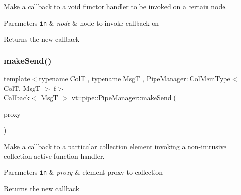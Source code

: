 Make a callback to a void functor handler to be invoked on a certain node. 


\begin{DoxyParams}[1]{Parameters}
\mbox{\tt in}  & {\em node} & node to invoke callback on\\
\hline
\end{DoxyParams}
\begin{DoxyReturn}{Returns}
the new callback 
\end{DoxyReturn}
\mbox{\label{structvt_1_1pipe_1_1_pipe_manager_a612b59953b949edc575577e313e3b187}} 
\subsubsection{\texorpdfstring{make\+Send()}{makeSend()}\hspace{0.1cm}{\footnotesize\ttfamily [4/6]}}
{\footnotesize\ttfamily template$<$typename ColT , typename MsgT , Pipe\+Manager\+::\+Col\+Mem\+Type$<$ Col\+T, Msg\+T $>$ f$>$ \\
\hyperlink{namespacevt_a36db99df4c973d48b1118a293fff533f}{Callback}$<$ MsgT $>$ vt\+::pipe\+::\+Pipe\+Manager\+::make\+Send (\begin{DoxyParamCaption}\item[{typename Col\+T\+::\+Proxy\+Type}]{proxy }\end{DoxyParamCaption})}



Make a callback to a particular collection element invoking a non-\/intrusive collection active function handler. 


\begin{DoxyParams}[1]{Parameters}
\mbox{\tt in}  & {\em proxy} & element proxy to collection\\
\hline
\end{DoxyParams}
\begin{DoxyReturn}{Returns}
the new callback 
\end{DoxyReturn}
\mbox{\label{structvt_1_1pipe_1_1_pipe_manager_a87e25e6a0151c0a9a48b58e6f4679b02}} 
